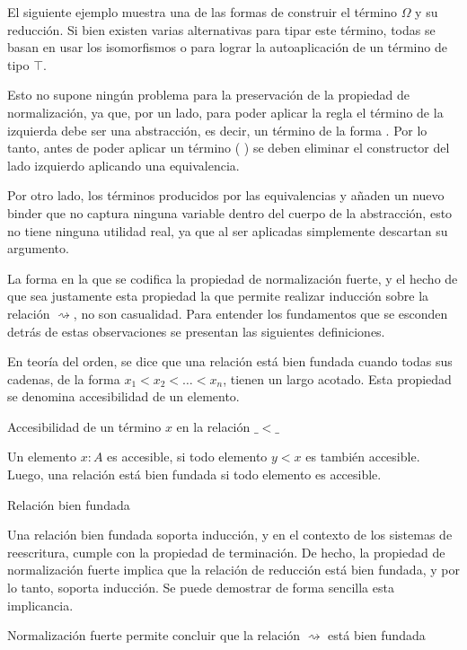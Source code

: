 \begin{example}
	El siguiente ejemplo muestra una de las formas de construir el término $\Omega$ y su reducción.
	Si bien existen varias alternativas para tipar este término, todas se basan en usar los isomorfismos  o  para lograr la autoaplicación de un término de tipo $\top$.
	
	Esto no supone ningún problema para la preservación de la propiedad de normalización, ya que, por un lado, para poder aplicar la regla  el término de la izquierda debe ser una abstracción, es decir, un término de la forma  .
	Por lo tanto, antes de poder aplicar un término (\const{[}  \const{]≡} )   se deben eliminar el constructor  del lado izquierdo aplicando una equivalencia.
	
	Por otro lado, los términos producidos por las equivalencias  y  añaden un nuevo binder que no captura ninguna variable dentro del cuerpo de la abstracción, esto no tiene ninguna utilidad real, ya que al ser aplicadas simplemente descartan su argumento.
	
\end{example}

La forma en la que se codifica la propiedad de normalización fuerte, y el hecho de que sea justamente esta propiedad la que permite realizar inducción sobre la relación $\rightsquigarrow$, no son casualidad.
Para entender los fundamentos que se esconden detrás de estas observaciones se presentan las siguientes definiciones.

En teoría del orden, se dice que una relación está bien fundada cuando todas sus cadenas, de la forma $x_1 < x_2 < \dots < x_n$, tienen un largo acotado.
Esta propiedad se denomina accesibilidad de un elemento.

\begin{codigo}
	Accesibilidad de un término $x$ en la relación $\_<\_$
\end{codigo}

Un elemento $x: A$ es accesible, si todo elemento $y < x$ es también accesible.
Luego, una relación está bien fundada si todo elemento es accesible.

\begin{codigo}
	Relación bien fundada
\end{codigo}

Una relación bien fundada soporta inducción, y en el contexto de los sistemas de reescritura, cumple con la propiedad de terminación.
De hecho, la propiedad de normalización fuerte implica que la relación de reducción está bien fundada, y por lo tanto, soporta inducción.
Se puede demostrar de forma sencilla esta implicancia.

\begin{codigo}
	Normalización fuerte permite concluir que la relación $\rightsquigarrow$ está bien fundada
\end{codigo} 
